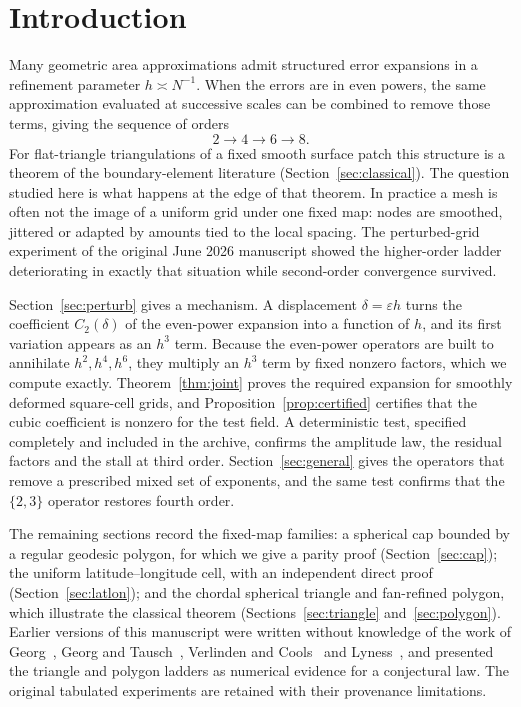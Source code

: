 \documentclass[11pt]{article}
\theoremstyle{remark}
\begin{document}
\section{Introduction}
Many geometric area approximations admit structured error expansions in a refinement
parameter $h\asymp N^{-1}$. When the errors are in even powers, the same approximation
evaluated at successive scales can be combined to remove those terms, giving the sequence of
orders
\[
2\longrightarrow 4\longrightarrow 6\longrightarrow 8 .
\]
For flat-triangle triangulations of a fixed smooth surface patch this structure is a theorem
of the boundary-element literature (Section~\ref{sec:classical}). The question studied here is
what happens at the edge of that theorem. In practice a mesh is often not the image of a
uniform grid under one fixed map: nodes are smoothed, jittered or adapted by amounts tied to
the local spacing. The perturbed-grid experiment of the original June 2026 manuscript showed
the higher-order ladder deteriorating in exactly that situation while second-order
convergence survived.

Section~\ref{sec:perturb} gives a mechanism. A displacement $\delta=\varepsilon h$ turns the
coefficient $C_2(\delta)$ of the even-power expansion into a function of $h$, and its first
variation appears as an $h^3$ term. Because the even-power operators are built to annihilate
$h^2,h^4,h^6$, they multiply an $h^3$ term by fixed nonzero factors, which we compute
exactly. Theorem~\ref{thm:joint} proves the required expansion for smoothly deformed
square-cell grids, and Proposition~\ref{prop:certified} certifies that the cubic coefficient
is nonzero for the test field. A deterministic test, specified completely and included in the archive, confirms the
amplitude law, the residual factors and the stall at third order.
Section~\ref{sec:general} gives the operators that remove a prescribed mixed set of
exponents, and the same test confirms that the $\{2,3\}$ operator restores fourth order.

The remaining sections record the fixed-map families: a spherical cap bounded by a regular
geodesic polygon, for which we give a parity proof (Section~\ref{sec:cap}); the uniform
latitude--longitude cell, with an independent direct proof (Section~\ref{sec:latlon}); and the
chordal spherical triangle and fan-refined polygon, which illustrate the classical theorem
(Sections~\ref{sec:triangle} and~\ref{sec:polygon}). Earlier versions of this manuscript were
written without knowledge of the work of Georg~\cite{georg91}, Georg and
Tausch~\cite{georgtausch}, Verlinden and Cools~\cite{verlindencools} and
Lyness~\cite{lyness94}, and presented the triangle and polygon ladders as numerical evidence
for a conjectural law. The original tabulated experiments are retained with their provenance
limitations.
\end{document}
